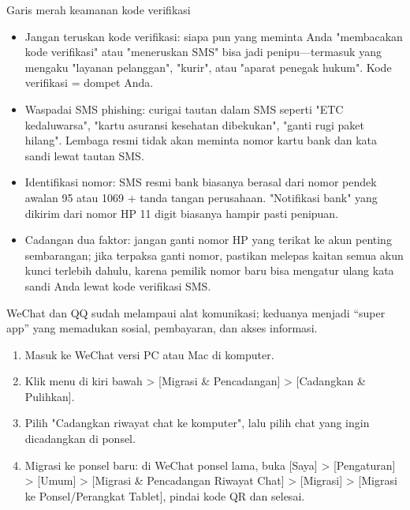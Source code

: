 \begin{tcbwarn}{Garis merah keamanan kode verifikasi}
\begin{itemize}
  \item Jangan teruskan kode verifikasi: siapa pun yang meminta Anda "membacakan kode verifikasi" atau "meneruskan SMS" bisa jadi penipu—termasuk yang mengaku "layanan pelanggan", "kurir", atau "aparat penegak hukum". Kode verifikasi = dompet Anda.
  \item Waspadai SMS phishing: curigai tautan dalam SMS seperti "ETC kedaluwarsa", "kartu asuransi kesehatan dibekukan", "ganti rugi paket hilang". Lembaga resmi tidak akan meminta nomor kartu bank dan kata sandi lewat tautan SMS.
  \item Identifikasi nomor: SMS resmi bank biasanya berasal dari nomor pendek awalan 95 atau 1069 + tanda tangan perusahaan. "Notifikasi bank" yang dikirim dari nomor HP 11 digit biasanya hampir pasti penipuan.
  \item Cadangan dua faktor: jangan ganti nomor HP yang terikat ke akun penting sembarangan; jika terpaksa ganti nomor, pastikan melepas kaitan semua akun kunci terlebih dahulu, karena pemilik nomor baru bisa mengatur ulang kata sandi Anda lewat kode verifikasi SMS.
\end{itemize}

\end{tcbwarn}


WeChat dan QQ sudah melampaui alat komunikasi; keduanya menjadi “super app” yang memadukan sosial, pembayaran, dan akses informasi.


\begin{enumerate}
  \item Masuk ke WeChat versi PC atau Mac di komputer.
  \item Klik menu di kiri bawah > [Migrasi \& Pencadangan] > [Cadangkan \& Pulihkan].
  \item Pilih "Cadangkan riwayat chat ke komputer", lalu pilih chat yang ingin dicadangkan di ponsel.
  \item Migrasi ke ponsel baru: di WeChat ponsel lama, buka [Saya] > [Pengaturan] > [Umum] > [Migrasi \& Pencadangan Riwayat Chat] > [Migrasi] > [Migrasi ke Ponsel/Perangkat Tablet], pindai kode QR dan selesai.
\end{enumerate}

